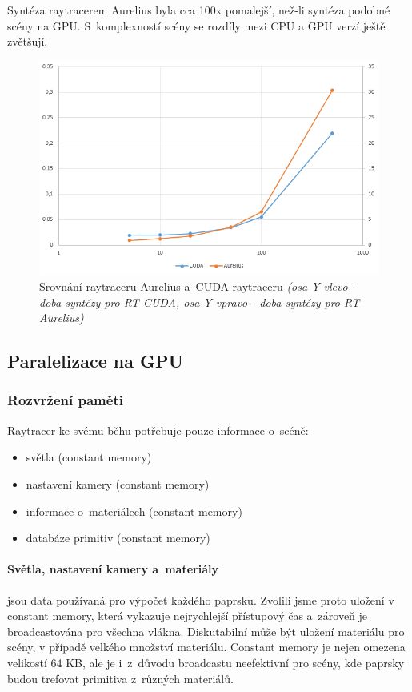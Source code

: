 \documentclass[12pt,a4paper,titlepage,final]{report}
\begin{document}
Syntéza raytracerem Aurelius byla cca 100x pomalejší, než-li syntéza podobné scény na GPU. S~komplexností scény se rozdíly mezi CPU a GPU verzí ještě zvětšují.


\begin{figure}
\begin{center}
\includegraphics[width=16cm]{images/srovnani.png}
\caption{Srovnání raytraceru Aurelius a~CUDA raytraceru \textit{(osa Y vlevo - doba syntézy pro RT CUDA, osa Y vpravo - doba syntézy pro RT Aurelius)}}
\end{center}
\end{figure}

\subsection{Paralelizace na GPU}

\subsubsection{Rozvržení paměti} 

Raytracer ke svému běhu potřebuje pouze informace o~scéně:
\begin{itemize}
	\item světla (constant memory)
	\item nastavení kamery (constant memory)
	\item informace o~materiálech (constant memory)
	\item databáze primitiv (constant memory)
\end{itemize}

\paragraph{Světla, nastavení kamery a~materiály} jsou data používaná pro výpočet každého paprsku. Zvolili jsme proto uložení v constant memory, která vykazuje nejrychlejší přístupový čas a~zároveň je broadcastována pro všechna vlákna. Diskutabilní může být uložení materiálu pro scény, v případě velkého množství materiálu. Constant memory je nejen omezena velikostí 64 KB, ale je i~z~důvodu broadcastu neefektivní pro scény, kde paprsky budou trefovat primitiva z~různých materiálů.
\end{document}
